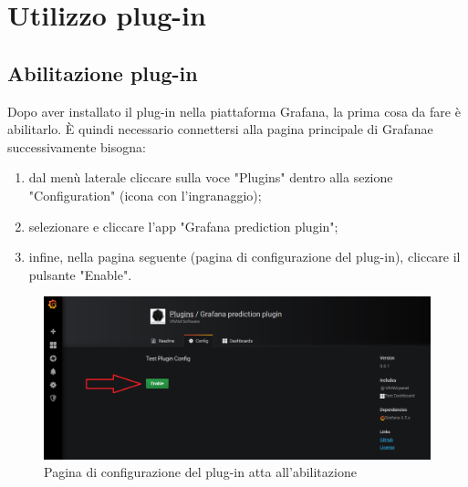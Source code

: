 \section{Utilizzo plug-in}
    \subsection{Abilitazione plug-in}
        Dopo aver installato il plug-in nella piattaforma Grafana\glo, la prima cosa da fare è abilitarlo. È quindi necessario connettersi alla pagina principale di Grafana\glosp e successivamente bisogna:
        \begin{enumerate}
            \item dal menù laterale cliccare sulla voce "Plugins" dentro alla sezione "Configuration" (icona con l'ingranaggio);
            \item selezionare e cliccare l'app "Grafana prediction plugin";
            \item infine, nella pagina seguente (pagina di configurazione del plug-in), cliccare il pulsante "Enable".
        \end{enumerate}
        \begin{figure}[H]
            \includegraphics[width=\textwidth,height=\textheight,keepaspectratio]{img/abilitazione_plug-in.png}
            \caption{Pagina di configurazione del plug-in atta all'abilitazione}
        \end{figure}
